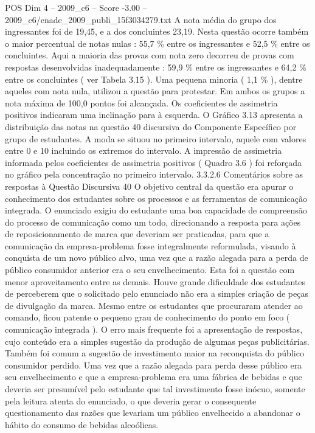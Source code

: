 \begin{textsample}{POS Dim 4 – 2009\_c6 – Score -3.00 – 2009\_c6/enade\_2009\_publi\_15f3034279.txt}
A nota média do grupo dos ingressantes foi de 19,45, e a dos concluintes 23,19.
Nesta questão ocorre também o maior percentual de notas nulas : 55,7 \% entre os ingressantes e 52,5 \% entre os concluintes.
Aqui a maioria das provas com nota zero decorreu de provas com respostas desenvolvidas inadequadamente : 59,9 \% entre os ingressantes e 64,2 \% entre os concluintes ( ver Tabela 3.15 ).
Uma pequena minoria ( 1,1 \% ), dentre aqueles com nota nula, utilizou a questão para protestar.
Em ambos os grupos a nota máxima de 100,0 pontos foi alcançada.
Os coeficientes de assimetria positivos indicaram uma inclinação para à esquerda.
O Gráfico 3.13 apresenta a distribuição das notas na questão 40 discursiva do Componente Específico por grupo de estudantes.
A moda se situou no primeiro intervalo, aquele com valores entre 0 e 10 incluindo os extremos do intervalo.
A impressão de assimetria informada pelos coeficientes de assimetria positivos ( Quadro 3.6 ) foi reforçada no gráfico pela concentração no primeiro intervalo. 3.3.2.6 Comentários sobre as respostas à Questão Discursiva 40 O objetivo central da questão era apurar o conhecimento dos estudantes sobre os processos e as ferramentas de comunicação integrada.
O enunciado exigiu do estudante uma boa capacidade de compreensão do processo de comunicação como um todo, direcionando a resposta para ações de reposicionamento de marca que deveriam ser praticadas, para que a comunicação da empresa-problema fosse integralmente reformulada, visando à conquista de um novo público alvo, uma vez que a razão alegada para a perda de público consumidor anterior era o seu envelhecimento.
Esta foi a questão com menor aproveitamento entre as demais.
Houve grande dificuldade dos estudantes de perceberem que o solicitado pelo enunciado não era a simples criação de peças de divulgação da marca.
Mesmo entre os estudantes que procuraram atender ao comando, ficou patente o pequeno grau de conhecimento do ponto em foco ( comunicação integrada ).
O erro mais frequente foi a apresentação de respostas, cujo conteúdo era a simples sugestão da produção de algumas peças publicitárias.
Também foi comum a sugestão de investimento maior na reconquista do público consumidor perdido.
Uma vez que a razão alegada para perda desse público era seu envelhecimento e que a empresa-problema era uma fábrica de bebidas e que deveria ser presumível pelo estudante que tal investimento fosse inócuo, somente pela leitura atenta do enunciado, o que deveria gerar o consequente questionamento das razões que levariam um público envelhecido a abandonar o hábito do consumo de bebidas alcoólicas.

\end{textsample}
